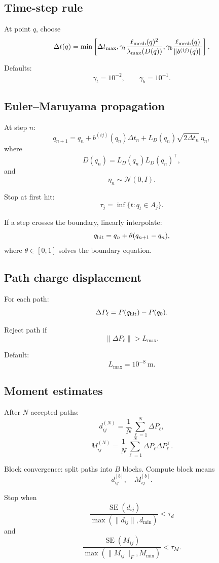 \subsection{Time-step rule}

At point \(q\), choose
\[
\Delta t(q)
=
\min\left[
\Delta t_{\max},
\gamma_t
\frac{\ell_{\rm mesh}(q)^2}{\lambda_{\max}(D(q))},
\gamma_b
\frac{\ell_{\rm mesh}(q)}{\|b^{(ij)}(q)\|}
\right].
\]

Defaults:
\[
\gamma_t=10^{-2},
\qquad
\gamma_b=10^{-1}.
\]

\subsection{Euler--Maruyama propagation}

At step \(n\):
\[
q_{n+1}
=
q_n
+
b^{(ij)}(q_n)\Delta t_n
+
L_D(q_n)\sqrt{2\Delta t_n}\,\eta_n,
\]
where
\[
D(q_n)=L_D(q_n)L_D(q_n)^\top,
\]
and
\[
\eta_n\sim\mathcal N(0,I).
\]

Stop at first hit:
\[
\tau_j=\inf\{t:q_t\in A_j\}.
\]

If a step crosses the boundary, linearly interpolate:
\[
q_{\rm hit}=q_n+\theta(q_{n+1}-q_n),
\]
where \(\theta\in[0,1]\) solves the boundary equation.

\subsection{Path charge displacement}

For each path:
\[
\Delta P_\ell=P(q_{\rm hit})-P(q_0).
\]

Reject path if
\[
\|\Delta P_\ell\|>L_{\max}.
\]

Default:
\[
L_{\max}=10^{-8}\ \mathrm m.
\]

\subsection{Moment estimates}

After \(N\) accepted paths:
\[
d_{ij}^{(N)}
=
\frac{1}{N}\sum_{\ell=1}^N\Delta P_\ell,
\]
\[
M_{ij}^{(N)}
=
\frac{1}{N}\sum_{\ell=1}^N\Delta P_\ell\Delta P_\ell^\top.
\]

Block convergence: split paths into \(B\) blocks. Compute block means
\[
d_{ij}^{[b]},\quad M_{ij}^{[b]}.
\]

Stop when
\[
\frac{\operatorname{SE}(d_{ij})}{\max(\|d_{ij}\|,d_{\min})}<\tau_d
\]
and
\[
\frac{\operatorname{SE}(M_{ij})}{\max(\|M_{ij}\|_F,M_{\min})}<\tau_M.
\]

